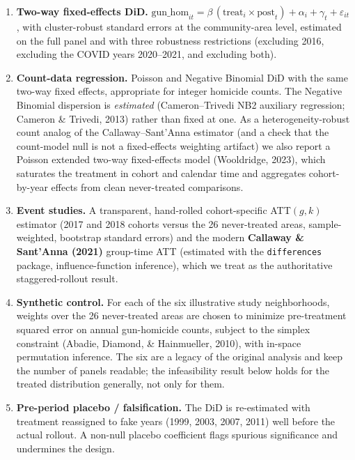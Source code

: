 \documentclass[12pt]{article}
\begin{document}
\begin{enumerate}
\itemsep0.2em
\item \textbf{Two-way fixed-effects DiD.}
$\text{gun\_hom}_{it} = \beta\,(\text{treat}_i \times \text{post}_t) + \alpha_i +
\gamma_t + \varepsilon_{it}$, with cluster-robust standard errors at the community-area
level, estimated on the full panel and with three robustness restrictions (excluding
2016, excluding the COVID years 2020--2021, and excluding both).

\item \textbf{Count-data regression.} Poisson and Negative Binomial DiD with the same
two-way fixed effects, appropriate for integer homicide counts. The Negative Binomial
dispersion is \emph{estimated} (Cameron--Trivedi NB2 auxiliary regression; Cameron \&
Trivedi, 2013) rather than fixed at one. As a heterogeneity-robust count analog of the
Callaway--Sant'Anna estimator (and a check that the count-model null is not a
fixed-effects weighting artifact) we also report a Poisson extended two-way fixed-effects
model (Wooldridge, 2023), which saturates the treatment in cohort and calendar time and
aggregates cohort-by-year effects from clean never-treated comparisons.

\item \textbf{Event studies.} A transparent, hand-rolled cohort-specific ATT$(g,k)$
estimator (2017 and 2018 cohorts versus the 26 never-treated areas, sample-weighted,
bootstrap standard errors) and the modern \textbf{Callaway \& Sant'Anna (2021)}
group-time ATT (estimated with the \texttt{differences} package, influence-function
inference), which we treat as the authoritative staggered-rollout result.

\item \textbf{Synthetic control.} For each of the six illustrative study neighborhoods,
weights over the 26 never-treated areas are chosen to minimize pre-treatment squared error
on annual gun-homicide counts, subject to the simplex constraint (Abadie, Diamond, \&
Hainmueller, 2010), with in-space permutation inference. The six are a legacy of the
original analysis and keep the number of panels readable; the infeasibility result below
holds for the treated distribution generally, not only for them.

\item \textbf{Pre-period placebo / falsification.} The DiD is re-estimated with
treatment reassigned to fake years (1999, 2003, 2007, 2011) well before the actual
rollout. A non-null placebo coefficient flags spurious significance and undermines the
design.
\end{enumerate}
\end{document}
